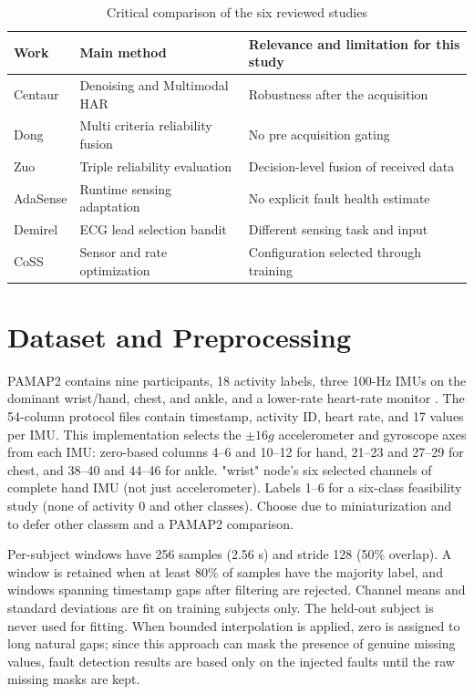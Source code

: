 \documentclass[conference]{IEEEtran}
\begin{document}
\begin{table}[t]
\caption{Critical comparison of the six reviewed studies}
\centering\footnotesize
\begin{tabular}{p{}p{}p{}}
\toprule Work & Main method & Relevance and limitation for this study \\
\midrule
Centaur \cite{centaur} & Denoising and Multimodal HAR & Robustness after the acquisition \\
Dong \cite{dong} & Multi criteria reliability fusion & No pre acquisition gating \\
Zuo \cite{zuo} & Triple reliability evaluation & Decision-level fusion of received data \\
AdaSense \cite{adasense} & Runtime sensing adaptation & No explicit fault health estimate \\
Demirel \cite{demirel} & ECG lead selection bandit & Different sensing task and input \\
CoSS \cite{coss} & Sensor and rate optimization & Configuration selected through training \\
\bottomrule
\end{tabular}
\end{table}

\section{Dataset and Preprocessing}
PAMAP2 contains nine participants, 18 activity labels, three 100-Hz IMUs on the dominant wrist/hand, chest, and ankle, and a lower-rate heart-rate monitor \cite{pamap2}. The 54-column protocol files contain timestamp, activity ID, heart rate, and 17 values per IMU. This implementation selects the $\pm16g$ accelerometer and gyroscope axes from each IMU: zero-based columns 4--6 and 10--12 for hand, 21--23 and 27--29 for chest, and 38--40 and 44--46 for ankle. "wrist" node's six selected channels of complete hand IMU (not just accelerometer). Labels 1--6 for a six-class feasibility study (none of activity 0 and other classes). Choose due to miniaturization and to defer other classsm and a PAMAP2 comparison.

Per-subject windows have 256 samples (2.56 s) and stride 128 (50\% overlap). A window is retained when at least 80\% of samples have the majority label, and windows spanning timestamp gaps after filtering are rejected. Channel means and standard deviations are fit on training subjects only. The held-out subject is never used for fitting. When bounded interpolation is applied, zero is assigned to long natural gaps; since this approach can mask the presence of genuine missing values, fault detection results are based only on the injected faults until the raw missing masks are kept.
\end{document}
